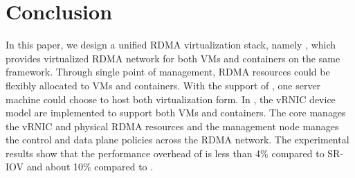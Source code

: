 \section{Conclusion} \label{conclusion}
In this paper, we design a unified RDMA virtualization stack, namely \sys, which provides virtualized RDMA network for both VMs and containers on the same framework.
Through single point of management, RDMA resources could be flexibly allocated to VMs and containers. With the support of \sys, one server machine could choose to host both virtualization form.
In \sys, the vRNIC device model are implemented to support both VMs and containers. The \sys core manages the vRNIC and physical RDMA resources and the management node manages the control and data plane policies across the RDMA network. The experimental results show that the performance overhead of \sys is less than 4\% compared to SR-IOV and about 10\% compared to \native.
